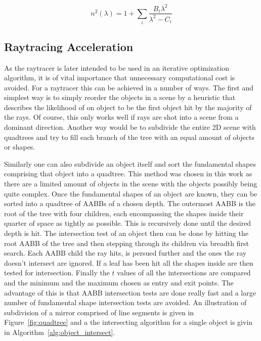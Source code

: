\documentclass[a4paper,10pt]{article}
\newcommand{\figref}[1]{Figure~\ref{#1}}
\newcommand{\algref}[1]{Algorithm~\ref{#1}}
\begin{document}
    \begin{equation}
        \label{equ:sellmeier}
        n^2(\lambda) = 1 + \sum_i \frac{B_i \lambda^2}{\lambda^2 - C_i}
    \end{equation}

    \subsection{Raytracing Acceleration} \label{sec:raytracing_acceleration}

    As the raytracer is later intended to be used in an iterative optimization
    algorithm, it is of vital importance that unnecessary computational cost 
    is avoided.
    For a raytracer this can be achieved in a number of ways.
    The first and simplest way is to simply reorder the objects in a scene
    by a heuristic that describes the likelihood of on object to be the
    first object hit by the majority of the rays.
    Of course, this only works well if rays are shot into a scene from
    a dominant direction.
    Another way would be to subdivide the entire 2D scene with quadtrees
    and try to fill each branch of the tree with an equal amount of 
    objects or shapes.
    
    Similarly one can also subdivide an object itself and sort the
    fundamental shapes comprising that object into a quadtree.
    This method was chosen in this work as there are a limited amount of
    objects in the scene with the objects possibly being quite complex.
    Once the fundamental shapes of an object are known, they can be
    sorted into a quadtree of AABBs of a chosen depth.
    The outermost AABB is the root of the tree with four children,
    each encompassing the shapes inside their quarter of space
    as tightly as possible.
    This is recursively done until the desired depth is hit.
    The intersection test of an object then can be done by hitting
    the root AABB of the tree and then stepping through its children
    via breadth first search.
    Each AABB child the ray hits, is persued further and the ones
    the ray doesn't intersect are ignored.
    If a leaf has been hit all the shapes inside are then tested for
    intersection.
    Finally the $t$ values of all the intersections are compared and
    the minimum and the maximum chosen as entry and exit points. 
    The advantage of this is that AABB intersection tests are done really
    fast and a large number of fundamental shape intersection tests
    are avoided.
    An illustration of subdivision of a mirror comprised of line segments
    is given in \figref{fig:quadtree} and a the intersecting algorithm
    for a single object is givin in \algref{alg:object_intersect}.
\end{document}
